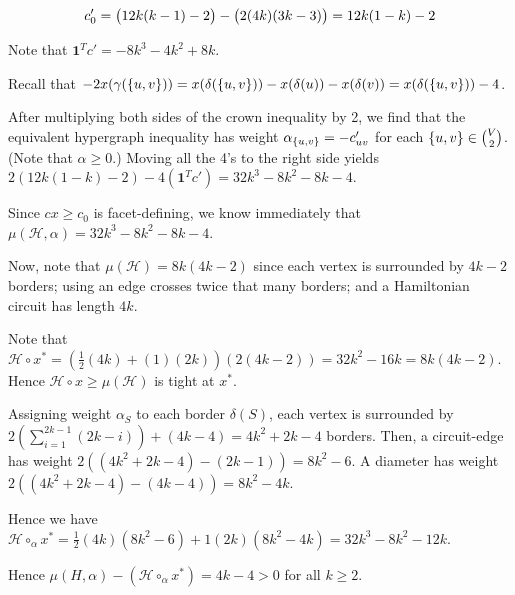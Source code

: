 \documentclass{article}
\begin{document}
$$c'_0 = \del{12k(k-1)-2} - \del{2(4k)(3k-3)} = 12k(1-k)-2 $$

Note that $\mathbf{1}^Tc' = -8k^3-4k^2+8k$.

Recall that $-2x(\gamma(\cbr{u,v})) = x(\delta(\cbr{u,v})) - x(\delta(u))-x(\delta(v)) = x(\delta(\cbr{u,v}))-4$.

After multiplying both sides of
the crown inequality by 2, we find that the equivalent hypergraph inequality
has weight $\alpha_{\cbr{u,v}} = -c'_{uv}$ for each $\cbr{u,v}\in{V\choose 2}$.
(Note that $\alpha \geq 0$.)
Moving all the 4's to the right side
yields $2(12k(1-k)-2) - 4(\mathbf{1}^Tc') = 32k^3-8k^2-8k-4$.

Since $cx\geq c_0$ is facet-defining, we
know immediately that $\mu(\mathcal{H}, \alpha) = 32k^3-8k^2-8k-4$.

Now, note that $\mu(\mathcal{H}) = 8k(4k-2)$ since each
vertex is surrounded by $4k-2$ borders;
using an edge crosses twice that many borders;
and a Hamiltonian circuit has length $4k$.


Note that $\mathcal{H}\circ x^* = (\frac{1}{2}(4k)+(1)(2k))(2(4k-2)) = 32k^2-16k = 8k(4k-2)$.
Hence $\mathcal{H}\circ x\geq \mu(\mathcal{H})$ is tight at $x^*$.

Assigning weight $\alpha_S$ to each border $\delta(S)$,
each vertex is surrounded by $2(\sum_{i=1}^{2k-1} (2k-i)) + (4k-4) = 4k^2+2k-4$ borders.
Then, a circuit-edge has weight $2((4k^2+2k-4)-(2k-1)) = 8k^2-6$.
A diameter has weight $2((4k^2+2k-4)-(4k-4)) = 8k^2-4k$.

Hence we have 
$\mathcal{H}\circ_\alpha x^* = \frac{1}{2}(4k)(8k^2-6) + 1(2k)(8k^2-4k) = 32k^3-8k^2-12k$. 

Hence $\mu(H,\alpha) - (\mathcal{H}\circ_\alpha x^*) = 4k-4 > 0$ for all $k\geq 2$.
\end{document}

